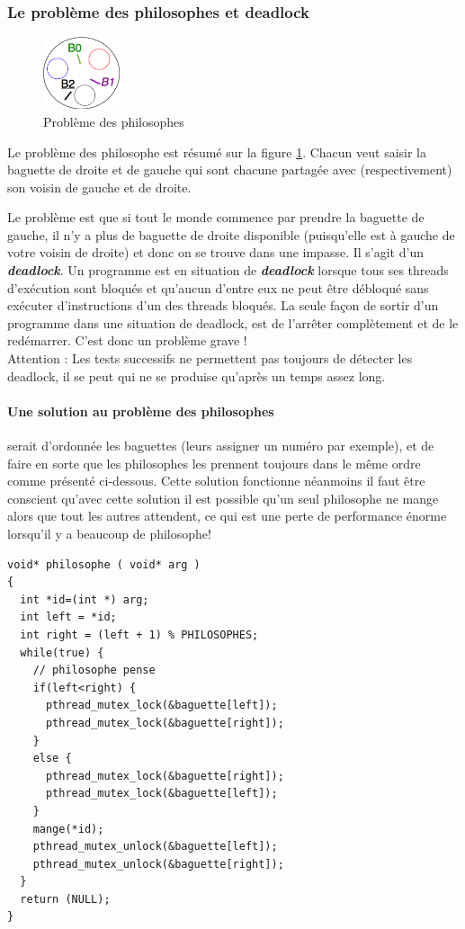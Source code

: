 \subsubsection{Le problème des philosophes et deadlock}
\begin{figure}
  \vspace{-0.5cm}
  \includegraphics[width=0.2\textwidth]{philosophes}
  \caption{\label{fig:philosophes}Problème des philosophes}
\end{figure}
Le problème des philosophe est résumé sur la figure \ref{fig:philosophes}.
Chacun veut saisir la baguette de droite et de gauche qui sont chacune partagée avec (respectivement) son voisin de gauche et de droite.

Le problème est que si tout le monde commence par prendre la baguette de gauche, il n'y a plus de baguette de droite disponible (puisqu'elle est à gauche de votre voisin de droite) et donc on se trouve dans une impasse.
Il s'agit d'un \textbf{\textit{deadlock}}.
Un programme est en situation de \textbf{\textit{deadlock}} lorsque tous ses threads d'exécution sont bloqués et qu'aucun d'entre eux ne peut être débloqué sans exécuter d'instructions d'un des threads bloqués.
La seule façon de sortir d'un programme dans une situation de deadlock, est de l'arrêter complètement et de le redémarrer.
C'est donc un problème grave !\\
Attention : Les tests successifs ne permettent pas toujours de détecter les deadlock, il se peut qui ne se produise qu'après un temps assez long.


\paragraph{Une solution au problème des philosophes} serait d'ordonnée les baguettes (leurs assigner un numéro par exemple), et de faire en sorte que les philosophes les prennent toujours dans le même ordre comme présenté ci-dessous.
Cette solution fonctionne néanmoins il faut être conscient qu'avec cette solution il est possible qu'un seul philosophe ne mange alors que tout les autres attendent, ce qui est une perte de performance énorme lorsqu'il y a beaucoup de philosophe!
\begin{lstlisting}
void* philosophe ( void* arg )
{
  int *id=(int *) arg;
  int left = *id;
  int right = (left + 1) % PHILOSOPHES;
  while(true) {
    // philosophe pense
    if(left<right) {
      pthread_mutex_lock(&baguette[left]);
      pthread_mutex_lock(&baguette[right]);
    }
    else {
      pthread_mutex_lock(&baguette[right]);
      pthread_mutex_lock(&baguette[left]);
    }
    mange(*id);
    pthread_mutex_unlock(&baguette[left]);
    pthread_mutex_unlock(&baguette[right]);
  }
  return (NULL);
}
\end{lstlisting}


